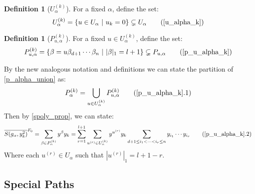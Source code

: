 \documentclass[12pt,reqno]{amsart}
\theoremstyle{plain}
\theoremstyle{definition}
\newtheorem{definition}[theorem]{Definition}
\begin{document}
\begin{definition}[$U^{(k)}_{\alpha}$] \label{u_alpha_k}
	For a fixed $\alpha$, define the set:
	\begin{equation}
		U_\alpha^{(k)} = \{u \in U_\alpha \ | \ u_k = 0 \} \subsetneq U_\alpha \tag{\ref*{u_alpha_k}}
	\end{equation}
\end{definition}
\begin{definition}[$P_{u,\alpha}^{(k)}$] \label{p_u_alpha_k}
	For a fixed $u \in U_\alpha^{(k)}$, define the set:
	\begin{equation}
		P_{u,\alpha}^{(k)} = \{\beta = u \beta_{d+1} \cdots \beta_n \ | \ |\beta|_1 = l + 1 \} \subsetneq P_{u,\alpha} \tag{\ref*{p_u_alpha_k}}
	\end{equation}	
\end{definition}

By the new analogous notation and definitions we can state the partition of \ref*{p_alpha_union} as:
\begin{equation*}
	P_\alpha^{(k)} = \bigcup_{u \in U_\alpha^{(k)}} P_{u,\alpha}^{(k)} \tag{\ref*{p_u_alpha_k}.1}
\end{equation*}
Then by \ref{spoly_prop}, we can state:
\begin{align} 
	\overline{S(g_\alpha, y_k^2)}^{F_0} = \sum_{\beta \in P_\alpha^{(k)}} y^\beta y_k  = \sum_{r=1}^{l+1}\sum_{u^{(r)} \in U_\alpha^{(k)}} y^{u^{(r)}}y_k \sum_{d+1 \leq i_1 < \cdots < i_r \leq n} y_{i_1} \cdots y_{i_{r}}  \tag{\ref*{p_u_alpha_k}.2}
\end{align}
Where each $u^{(r)} \in U_\alpha$ such that $|u^{(r)}|_1 = l + 1 - r$. 



























	
	
\clearpage


\subsection*{Special Paths}
\end{document}
